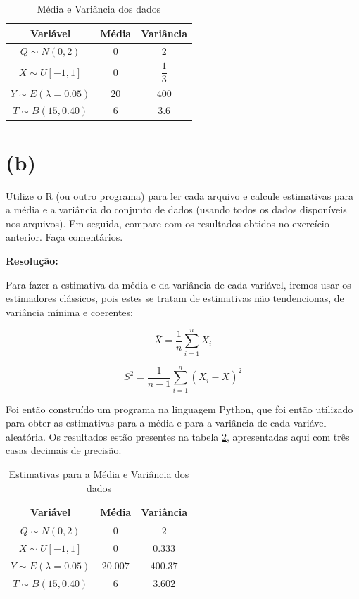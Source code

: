 \documentclass[]{abntex2}
\begin{document}
\begin{table}[H]
    \centering
    \begin{tabular}{|c|c|c|}
        \hline
        \textbf{Variável} & \textbf{Média} & \textbf{Variância} \\
        \hline
        $Q \sim N(0, 2)$ & $0$ & $2$ \\
        $X \sim U[-1, 1]$ & $0$ & $\dfrac{1}{3}$ \\
        $Y \sim E(\lambda = 0.05)$ & $20$ & $400$ \\
        $T \sim B(15, 0.40)$ & $6$ & $3.6$ \\
        \hline
    \end{tabular}
    \caption{Média e Variância dos dados}
    \label{tab:medvar}
\end{table}

\section*{\textbf{(b)}}

\noindent Utilize o R (ou outro programa) para ler cada arquivo e calcule estimativas para a
média e a variância do conjunto de dados (usando todos os dados disponíveis nos
arquivos). Em seguida, compare com os resultados obtidos no exercício anterior.
Faça comentários.

\textbf{Resolução:}

Para fazer a estimativa da média e da variância de cada variável, iremos usar os estimadores clássicos, pois estes se tratam de estimativas não tendencionas, de variância mínima e coerentes:

\[
\bar{X} = \dfrac{1}{n} \sum_{i=1}^{n} X_i
\]

\[
S^2 = \dfrac{1}{n-1} \sum_{i=1}^{n} (X_i - \bar{X})^2
\]

Foi então construído um programa na linguagem Python, que foi então utilizado para obter as estimativas para a média e para a variância de cada variável aleatória. Os resultados estão presentes na tabela \ref{tab:esti}, apresentadas aqui com três casas decimais de precisão.

\begin{table}[H]
    \centering
    \begin{tabular}{|c|c|c|}
        \hline
        \textbf{Variável} & \textbf{Média} & \textbf{Variância} \\
        \hline
        $Q \sim N(0, 2)$ & $ 0 $ & $2$ \\
        $X \sim U[-1, 1]$ & $0$ & $0.333$ \\
        $Y \sim E(\lambda = 0.05)$ & $20.007$ & $400.37$ \\
        $T \sim B(15, 0.40)$ & $6$ & $3.602$ \\
        \hline
    \end{tabular}
    \caption{Estimativas para a Média e Variância dos dados}
    \label{tab:esti}
\end{table}
\end{document}
